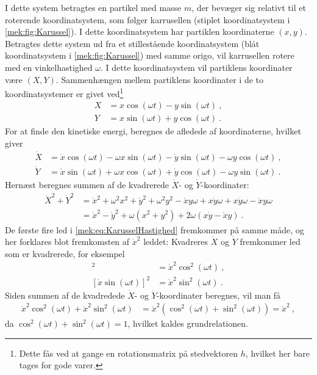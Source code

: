 \noindentm
I dette system betragtes en partikel med masse $m$, der bevæger sig relativt til et roterende koordinatsystem, som følger karrusellen (stiplet koordinatsystem i \cref{mek:fig:Karussel}). I dette koordinatsystem har partiklen koordinaterne $(x,y)$. Betragtes dette system ud fra et stillestående koordinatsystem (blåt koordinatsystem i \cref{mek:fig:Karussel}) med samme origo, vil karrusellen rotere med en vinkelhastighed $\omega$. I dette koordinatsystem vil partiklens koordinater være $(X,Y)$. Sammenhængen mellem partiklens koordinater i de to koordinatsystemer er givet ved\footnote{Dette fås ved at gange en rotationsmatrix på stedvektoren $h$, hvilket her bare tages for gode varer.}
%
\begin{equation} \label{mek:eq:Karussel_X_Y_koordinater}
	\begin{aligned}
		X &= x \cos(\omega t) - y \sin(\omega t) \: , \\
		Y &= x \sin(\omega t) + y \cos(\omega t) \: .
	\end{aligned}
\end{equation}
%
For at finde den kinetiske energi, beregnes de afledede af koordinaterne, hvilket giver
%
\begin{equation}
	\begin{aligned}
		\dot{X} &= \dot{x} \cos(\omega t) - \omega x \sin(\omega t) - \dot{y} \sin(\omega t) - \omega y \cos(\omega t) \: , \\
		\dot{Y} &= \dot{x} \sin(\omega t) + \omega x \cos(\omega t) + \dot{y} \cos(\omega t) - \omega y \sin(\omega t) \: .
	\end{aligned}
\end{equation}
%
Hernæst beregnes summen af de kvadrerede $\dot{X}$- og $\dot{Y}$-koordinater:
%
\begin{align} \label{mek:eq:KarusselHastighed}
	\dot{X}^2 + \dot{Y}^2 &= \dot{x}^2 + \omega^2 x^2 + \dot{y}^2 + \omega^2 y^2 - \dot{x}y \omega + x \dot{y} \omega + x \dot{y} \omega - \dot{x} y \omega \nonumber \\
	&= \dot{x}^2 - \dot{y}^2 + \omega(x^2 + y^2) + 2 \omega (x \dot{y} - \dot{x} y) \: .
\end{align}
%
De første fire led i \cref{mek:eq:KarusselHastighed} fremkommer på samme måde, og her forklares blot fremkomsten af $\dot{x}^2$ leddet: Kvadreres $\dot{X}$ og $\dot{Y}$ fremkommer led som er kvadrerede, for eksempel
%
\begin{align*}
	[\dot{x} \cos(\omega t)]^2 &= \dot{x}^2 \cos^2(\omega t) \: , \\
	[\dot{x} \sin(\omega t)]^2 &= \dot{x}^2 \sin^2(\omega t) \: .
\end{align*}
%
Siden summen af de kvadredede $\dot{X}$- og $\dot{Y}$-koordinater beregnes, vil man få
\begin{align*}
	\dot{x}^2 \cos^2(\omega t) + \dot{x}^2 \sin^2(\omega t) &= \dot{x}^2 (\cos^2(\omega t) + \sin^2(\omega t)) = \dot{x}^2 \: ,
\end{align*}
%
da $\cos^2(\omega t) + \sin^2(\omega t) = 1$, hvilket kaldes grundrelationen.


